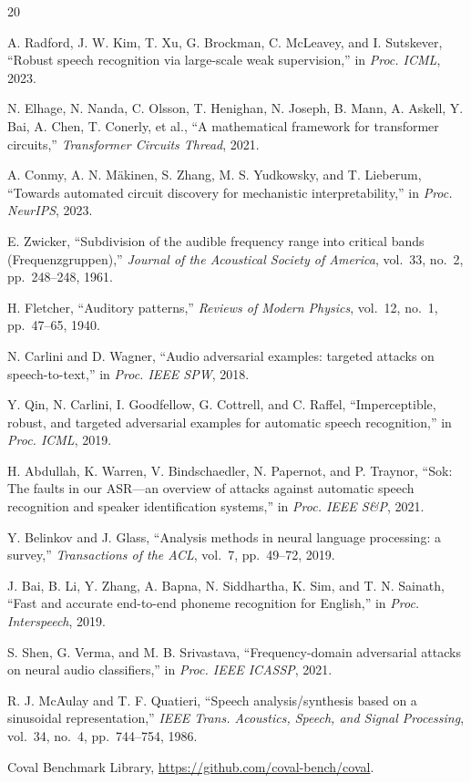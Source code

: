 \documentclass[11pt,a4paper]{article}
\begin{document}
\begin{thebibliography}{20}

 A. Radford, J. W. Kim, T. Xu, G. Brockman, C. McLeavey,
and I. Sutskever, ``Robust speech recognition via large-scale weak
supervision,'' in \emph{Proc. ICML}, 2023.

 N. Elhage, N. Nanda, C. Olsson, T. Henighan, N. Joseph,
B. Mann, A. Askell, Y. Bai, A. Chen, T. Conerly, et al., ``A mathematical
framework for transformer circuits,'' \emph{Transformer Circuits Thread}, 2021.

 A. Conmy, A. N. M\"{a}kinen, S. Zhang,
M. S. Yudkowsky, and T. Lieberum, ``Towards automated circuit discovery for
mechanistic interpretability,'' in \emph{Proc. NeurIPS}, 2023.

 E. Zwicker, ``Subdivision of the audible frequency
range into critical bands (Frequenzgruppen),'' \emph{Journal of the Acoustical
Society of America}, vol.~33, no.~2, pp.~248--248, 1961.

 H. Fletcher, ``Auditory patterns,'' \emph{Reviews of
Modern Physics}, vol.~12, no.~1, pp.~47--65, 1940.

 N. Carlini and D. Wagner, ``Audio adversarial examples:
targeted attacks on speech-to-text,'' in \emph{Proc. IEEE SPW}, 2018.

 Y. Qin, N. Carlini, I. Goodfellow, G. Cottrell, and
C. Raffel, ``Imperceptible, robust, and targeted adversarial examples for
automatic speech recognition,'' in \emph{Proc. ICML}, 2019.

 H. Abdullah, K. Warren, V. Bindschaedler, N. Papernot,
and P. Traynor, ``Sok: The faults in our ASR---an overview of attacks against
automatic speech recognition and speaker identification systems,'' in
\emph{Proc. IEEE S\&P}, 2021.

 Y. Belinkov and J. Glass, ``Analysis methods in
neural language processing: a survey,'' \emph{Transactions of the ACL}, vol.~7,
pp.~49--72, 2019.

 J. Bai, B. Li, Y. Zhang, A. Bapna, N. Siddhartha, K. Sim,
and T. N. Sainath, ``Fast and accurate end-to-end phoneme recognition for
English,'' in \emph{Proc. Interspeech}, 2019.

 S. Shen, G. Verma, and M. B. Srivastava,
``Frequency-domain adversarial attacks on neural audio classifiers,'' in
\emph{Proc. IEEE ICASSP}, 2021.

 R. J. McAulay and T. F. Quatieri, ``Speech
analysis/synthesis based on a sinusoidal representation,'' \emph{IEEE Trans.
Acoustics, Speech, and Signal Processing}, vol.~34, no.~4, pp.~744--754, 1986.

 Coval Benchmark Library,
\url{https://github.com/coval-bench/coval}.

\end{thebibliography}
\end{document}
